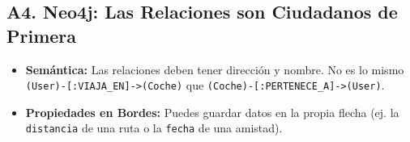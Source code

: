 \documentclass[12pt,a4paper]{article}
\begin{document}
\subsection*{A4. Neo4j: Las Relaciones son Ciudadanos de Primera}
\begin{itemize}
    \item \textbf{Semántica:} Las relaciones deben tener dirección y nombre. No es lo mismo \texttt{(User)-[:VIAJA\_EN]->(Coche)} que \texttt{(Coche)-[:PERTENECE\_A]->(User)}.
    \item \textbf{Propiedades en Bordes:} Puedes guardar datos en la propia flecha (ej. la \texttt{distancia} de una ruta o la \texttt{fecha} de una amistad).
\end{itemize}
\end{document}
